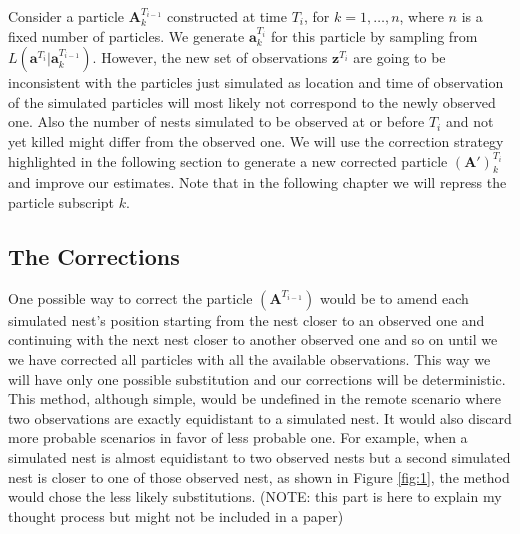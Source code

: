\documentclass{article}
\renewcommand{\vec}[1]{\mathbf{#1}}
\begin{document}
Consider a particle $\vec{A}_k^{T_{i-1}}$ constructed at time $T_i$, for $k = 1, \dots, n$, where $n$ is a fixed number of particles. We generate $\vec{a}^{T_{i}}_k$ for this particle by sampling from $L(\vec{a}^{T_i} | \vec{a}_k^{T_{i-1}})$. However, the new set of observations $\vec{z}^{T_i}$ are going to be inconsistent with the particles just simulated as location and time of observation of the simulated particles will most likely not correspond to the newly observed one. Also the number of nests simulated to be observed at or before $T_i$ and not yet killed might differ from the observed one. We will use the correction strategy highlighted in the following section to generate a new corrected particle $(\vec{A}')^{T_i}_k$ and improve our estimates. Note that in the following chapter we will repress the particle subscript $k$.



\subsection{The Corrections} \label{subsec:corrections}

One possible way to correct the particle $(\vec{A}^{T_{i-1}})$ would be to amend each simulated nest's position starting from the nest closer to an observed one and continuing with the next nest closer to another observed one and so on until we we have corrected all particles with all the available observations. This way we will have only one possible substitution and our corrections will be deterministic. This method, although simple, would be undefined in the remote scenario where two observations are exactly equidistant to a simulated nest. It would also discard more probable scenarios in favor of less probable one. For example, when a simulated nest is almost equidistant to two observed nests but a second simulated nest is closer to one of those observed nest, as shown in Figure \ref{fig:1}, the method would chose the less likely substitutions. (NOTE: this part is here to explain my thought process but might not be included in a paper)
\end{document}
